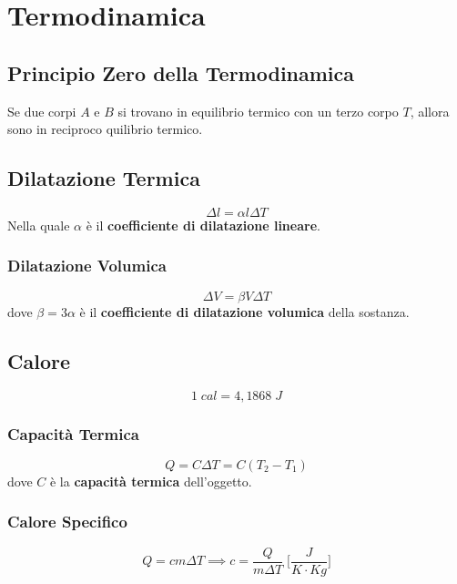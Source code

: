 \chapter*{Termodinamica}

    \section*{Principio Zero della Termodinamica} Se due corpi $A$ e $B$ si 
    trovano in equilibrio termico con un terzo corpo $T$, allora sono in 
    reciproco quilibrio termico.

    \section*{Dilatazione Termica}
            \begin{equation*}
                \Delta l = \alpha l \Delta T
            \end{equation*}
        Nella quale $\alpha$ è il \textbf{coefficiente di dilatazione lineare}.

        \subsection*{Dilatazione Volumica}
            \begin{equation*}
                \Delta V = \beta V \Delta T
            \end{equation*}
        dove $\beta = 3\alpha$ è il \textbf{coefficiente di dilatazione 
        volumica} della sostanza.

    \section*{Calore}
        \begin{equation*}
            1 \; cal = 4,1868 \; J
        \end{equation*}

        \subsection*{Capacità Termica}
            \begin{equation*}
                Q = C \Delta T = C (T_2 - T_1)
            \end{equation*}
        dove $C$ è la \textbf{capacità termica} dell'oggetto.

        \subsection*{Calore Specifico}
            \begin{equation*}
                Q = cm \Delta T
                \implies
                c = \frac{Q}{m \Delta T}
             \; \Bigg[\frac{J}{K \cdot Kg}\Bigg]
            \end{equation*}

